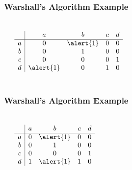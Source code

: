 \documentclass[dvipsnames]{beamer}
\begin{document}
\begin{frame}
  \frametitle{Warshall's Algorithm Example}

  \begin{example}
    \begin{columns}
      \begin{center}
      \end{center}

      \[
        \begin{array}{c|cccc}
              & a & b & c & d\\\hline
            a & 0 & \alert{1} & 0 & 0\\
            b & 0 & 1 & 0 & 0\\
            c & 0 & 0 & 0 & 1\\
            d & \alert{1} & 0 & 1 & 0
        \end{array}
      \]
    \end{columns}
  \end{example}
\end{frame}

\begin{frame}
  \frametitle{Warshall's Algorithm Example}

  \begin{example}
    \begin{columns}
      \begin{center}
      \end{center}

      \[
        \begin{array}{c|cccc}
              & a & b & c & d\\\hline
            a & 0 & \alert{1} & 0 & 0\\
            b & 0 & 1 & 0 & 0\\
            c & 0 & 0 & 0 & 1\\
            d & 1 & \alert{1} & 1 & 0
        \end{array}
      \]
    \end{columns}
  \end{example}
\end{frame}
\end{document}
